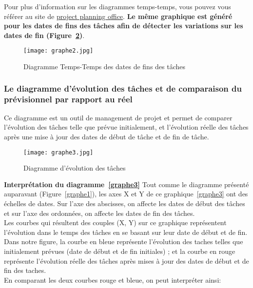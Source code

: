 Pour plus d'information sur les diagrammes temps-temps, vous pouvez vous référer au site de \href{http://www.projectplanningoffice.com/planification-projet-pert-outillage-planificateur-pert-pertificateur/diagramme-dates-dates}{project planning office}.
\textbf{Le même graphique est généré pour les dates de fins des tâches afin de détecter les variations sur les dates de fin (Figure~\ref{graphe2})}.
\begin{figure}[h]
\centering
\texttt{[image: graphe2.jpg]}
\caption{\label{graphe2}Diagramme Temps-Temps des dates de fins des tâches}
\end{figure}
\subsubsection*{Le diagramme d'évolution des tâches et de comparaison du prévisionnel par rapport au réel}
Ce diagramme est un outil de management de projet et permet de comparer l'évolution des tâches telle que prévue initialement, et l'évolution réelle des tâches après une mise à jour des dates de début de tâche et de fin de tâche.
\begin{figure}[h]
\centering
\texttt{[image: graphe3.jpg]}
\caption{\label{graphe2}Diagramme d'évolution des tâches}
\end{figure}
\textbf{Interprétation du diagramme~\ref{graphe3}}
Tout comme le diagramme présenté auparavant (Figure~\ref{graphe1}), les axes X et Y de ce graphique~\ref{graphe3} ont des échelles de dates. Sur l'axe des abscisses, on affecte les dates de début des tâches et sur l'axe des ordonnées, on affecte les dates de fin des tâches.\\
Les courbes qui résultent des couples (X, Y) sur ce graphique représentent l'évolution dans le temps des tâches en se basant sur leur date de début et de fin. \\
Dans notre figure, la courbe en bleue représente l'évolution des taches telles que initialement prévues (date de début et de fin initiales) ; et la courbe en rouge représente l'évolution réelle des tâches après mises à jour des dates de début et de fin des taches.\\
En comparant les deux courbes rouge et bleue, on peut interpréter ainsi:
